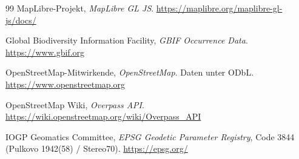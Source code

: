 \documentclass[12pt,a4paper]{scrreprt}
\begin{document}
\begin{thebibliography}{99}
MapLibre-Projekt,
\emph{MapLibre GL JS}.
\url{https://maplibre.org/maplibre-gl-js/docs/}

Global Biodiversity Information Facility,
\emph{GBIF Occurrence Data}.
\url{https://www.gbif.org}

OpenStreetMap-Mitwirkende,
\emph{OpenStreetMap}. Daten unter ODbL.
\url{https://www.openstreetmap.org}

OpenStreetMap Wiki,
\emph{Overpass API}.
\url{https://wiki.openstreetmap.org/wiki/Overpass_API}

IOGP Geomatics Committee,
\emph{EPSG Geodetic Parameter Registry}, Code 3844
(Pulkovo 1942(58) / Stereo70).
\url{https://epsg.org/}

\end{thebibliography}
\end{document}
